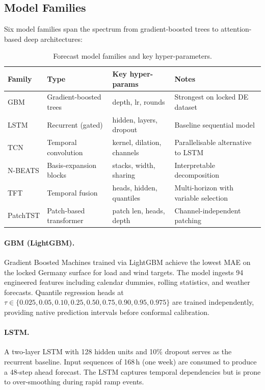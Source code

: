 \subsection{Model Families}
\label{sec:model-families}

Six model families span the spectrum from gradient-boosted trees to
attention-based deep architectures:

\begin{table}[ht]
\centering
\caption{Forecast model families and key hyper-parameters.}
\label{tab:model-families}
\begin{tabular}{llll}
\toprule
\textbf{Family} & \textbf{Type} & \textbf{Key hyper-params} &
  \textbf{Notes} \\
\midrule
GBM        & Gradient-boosted trees & depth, lr, rounds &
  Strongest on locked DE dataset \\
LSTM       & Recurrent (gated)      & hidden, layers, dropout &
  Baseline sequential model \\
TCN        & Temporal convolution   & kernel, dilation, channels &
  Parallelisable alternative to LSTM \\
N-BEATS    & Basis-expansion blocks & stacks, width, sharing &
  Interpretable decomposition \\
TFT        & Temporal fusion        & heads, hidden, quantiles &
  Multi-horizon with variable selection \\
PatchTST   & Patch-based transformer& patch len, heads, depth &
  Channel-independent patching \\
\bottomrule
\end{tabular}
\end{table}

\paragraph{GBM (LightGBM).}
Gradient Boosted Machines trained via LightGBM achieve the lowest MAE on
the locked Germany surface for load and wind targets.  The model ingests
94 engineered features including calendar dummies, rolling statistics, and
weather forecasts.  Quantile regression heads at $\tau \in
\{0.025, 0.05, 0.10, 0.25, 0.50, 0.75, 0.90, 0.95, 0.975\}$ are trained
independently, providing native prediction intervals before conformal
calibration.

\paragraph{LSTM.}
A two-layer LSTM with 128 hidden units and 10\% dropout serves as the
recurrent baseline.  Input sequences of 168\,h (one week) are consumed to
produce a 48-step ahead forecast.  The LSTM captures temporal dependencies
but is prone to over-smoothing during rapid ramp events.

